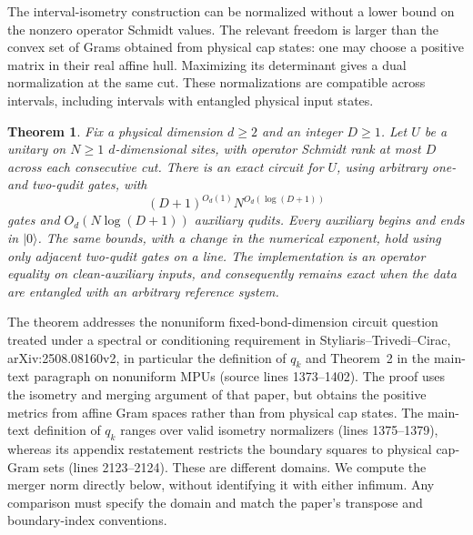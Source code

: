 \documentclass[11pt]{article}
\newtheorem{theorem}[lemma]{Theorem}
\begin{document}
The interval-isometry construction can be normalized without a lower
bound on the nonzero operator Schmidt values. The relevant freedom is
larger than the convex set of Grams obtained from physical cap states:
one may choose a positive matrix in their real affine hull. Maximizing
its determinant gives a dual normalization at the same cut. These
normalizations are compatible across intervals, including intervals
with entangled physical input states.

\begin{theorem}\label{thm:general-determinant-circuits}
Fix a physical dimension $d\geq2$ and an integer $D\geq1$.
Let $U$ be a unitary on $N\geq1$
$d$-dimensional sites, with operator Schmidt rank at most $D$ across
each consecutive cut. There is an exact circuit for $U$, using
arbitrary one- and two-qudit gates, with
\[
 (D+1)^{O_d(1)}N^{O_d(\log(D+1))}
\]
gates and $O_d(N\log(D+1))$ auxiliary qudits. Every auxiliary begins
and ends in $|0\rangle$. The same bounds, with a change in the numerical
exponent, hold using only adjacent two-qudit gates on a line.
The implementation is an operator equality on clean-auxiliary inputs,
and consequently remains exact when the data are entangled with an
arbitrary reference system.
\end{theorem}

The theorem addresses the nonuniform fixed-bond-dimension circuit
question treated under a spectral or conditioning requirement in
Styliaris--Trivedi--Cirac, arXiv:2508.08160v2, in particular the
definition of $q_k$ and Theorem~2 in the main-text paragraph on
nonuniform MPUs (source lines 1373--1402).
The proof uses the isometry and merging argument of that paper,
but obtains the positive metrics from affine Gram spaces rather than
from physical cap states. The main-text definition of $q_k$ ranges over
valid isometry normalizers (lines 1375--1379), whereas its appendix
restatement restricts the boundary squares to physical cap-Gram sets
(lines 2123--2124). These are different domains. We compute the merger
norm directly below, without identifying it with either infimum. Any
comparison must specify the domain and match the paper's transpose
and boundary-index conventions.
\end{document}
